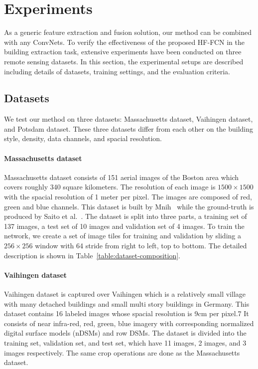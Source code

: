 \section{Experiments}
\label{Sec:exp}

As a generic feature extraction and fusion solution, our method can be combined with any ConvNets.
%
To verify the effectiveness of the proposed HF-FCN in the building extraction task, extensive experiments have been conducted on three remote sensing datasets. 
%
In this section, the experimental setups are described including details of datasets, training settings, and the evaluation criteria.


\subsection{Datasets}
We test our method on three datasets: Massachusetts dataset, Vaihingen dataset, and Potsdam dataset.
These three datasets differ from each other on the building style, density, data channels, and spacial resolution. 

\paragraph{Massachusetts dataset}
%
Massachusetts dataset consists of 151 aerial images of the Boston area which covers roughly 340 square kilometers.
The resolution of each image is $1500\times 1500$ with the spacial resolution of 1 meter per pixel.
The images are composed of red, green and blue channels.
This dataset is built by Mnih~\cite{IEEEexample:mnih2013machine} while the ground-truth is produced by Saito et al.~\cite{IEEEexample:saito2016multiple}.
%
The dataset is split into three parts, a training set of 137 images, a test set of 10 images and validation set of 4 images.
To train the network, we create a set of image tiles for training and validation by sliding a ${256\times256}$ window with 64 stride from right to left, top to bottom. The detailed description is shown in Table~\ref{table:dataset-composition}.

\paragraph{Vaihingen dataset}
%
Vaihingen dataset is captured over Vaihingen which is a relatively small village with many detached buildings and small multi story buildings in Germany.
This dataset contains 16 labeled images whose spacial resolution is 9cm per pixel.7
It consists of near infra-red, red, green, blue imagery with corresponding normalized digital surface models (nDSMs) and row DSMs. The dataset is divided into the training set, validation set, and test set, which have 11 images, 2 images, and 3 images respectively. 
%
The same crop operations are done as the Massachusetts dataset.

